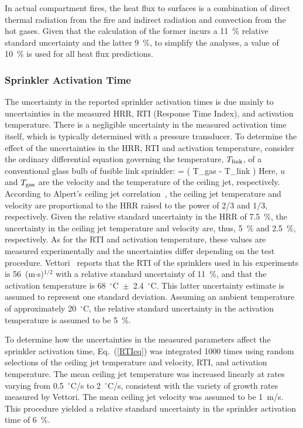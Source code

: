 In actual compartment fires, the heat flux to surfaces is a combination of direct thermal radiation from the fire and indirect radiation and convection from the hot gases. Given that the calculation of the former incurs a 11~\% relative standard uncertainty and the latter 9~\%, to simplify the analyses, a value of 10~\% is used for all heat flux predictions.

\subsubsection{Sprinkler Activation Time}
\label{uncertainty_sprinkler_acts}

The uncertainty in the reported sprinkler activation times is due mainly to uncertainties in the measured HRR, RTI (Response Time Index), and activation temperature. There is a negligible uncertainty in the measured activation time itself, which is typically determined with a pressure transducer. To determine the effect of the uncertainties in the HRR, RTI and activation temperature, consider the ordinary differential equation governing the temperature, $T_{\rm link}$, of a conventional glass bulb of fusible link sprinkler:
\be
    =  \left( T_{\rm gas} - T_{\rm link} \right) \label{RTIeq}
\ee
Here, $u$ and $T_{\rm gas}$  are the velocity and the temperature of the ceiling jet, respectively. According to Alpert's ceiling jet correlation~\cite{SFPE:Alpert}, the ceiling jet temperature and velocity are proportional to the HRR raised to the power of 2/3 and 1/3, respectively. Given the relative standard uncertainty in the HRR of 7.5~\%, the uncertainty in the ceiling jet temperature and velocity are, thus, 5~\% and 2.5~\%, respectively. As for the RTI and activation temperature, these values are measured experimentally and the uncertainties differ depending on the test procedure. Vettori~\cite{Vettori:1} reports that the RTI of the sprinklers used in his experiments is 56~(m$\cdot$s)$^{1/2}$ with a relative standard uncertainty of 11~\%, and that the activation temperature is 68~$^\circ$C~$\pm$~2.4~$^\circ$C. This latter uncertainty estimate is assumed to represent one standard deviation. Assuming an ambient temperature of approximately 20~$^\circ$C, the relative standard uncertainty in the activation temperature is assumed to be 5~\%.

To determine how the uncertainties in the measured parameters affect the sprinkler activation time, Eq.~(\ref{RTIeq}) was integrated 1000 times using random selections of the ceiling jet temperature and velocity, RTI, and activation temperature. The mean ceiling jet temperature was increased linearly at rates varying from 0.5~$^\circ$C/s to 2~$^\circ$C/s, consistent with the variety of growth rates measured by Vettori. The mean ceiling jet velocity was assumed to be 1~m/s. This procedure yielded a relative standard uncertainty in the sprinkler activation time of 6~\%.

